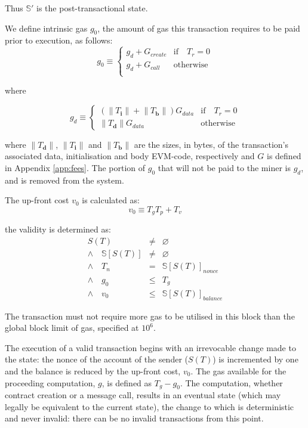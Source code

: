 \documentclass[9pt,oneside]{amsart}
\begin{document}
\begin{multicols}{2}
Thus $\mathbb{S}'$ is the post-transactional state.

We define intrinsic gas $g_0$, the amount of gas this transaction requires to be paid prior to execution, as follows:
\begin{equation}
g_0 \equiv \begin{cases}
g_d + G_{create} & \text{if} \quad T_r = 0 \\
g_d + G_{call} & \text{otherwise} \\
\end{cases}
\end{equation}

where

\begin{equation}
g_d \equiv \begin{cases} (\lVert T_\mathbf{i}\rVert + \lVert T_\mathbf{b}\rVert) G_{data} & \text{if} \quad T_r = 0 \\
 \lVert T_\mathbf{d}\rVert G_{data} & \text{otherwise}
 \end{cases}
\end{equation}

where $\lVert T_\mathbf{d}\rVert$, $\lVert T_\mathbf{i}\rVert$ and $\lVert T_\mathbf{b}\rVert$ are the sizes, in bytes, of the transaction's associated data, initialisation and body EVM-code, respectively and $G$ is defined in Appendix \ref{app:fees}. The portion of $g_0$ that will not be paid to the miner is $g_d$, and is removed from the system.


The up-front cost $v_0$ is calculated as:
\begin{equation}
v_0 \equiv T_g T_p + T_v
\end{equation}

the validity is determined as:
\begin{eqnarray}
S(T) & \neq & \varnothing \\ \wedge \quad \mathbb{S}[S(T)] & \neq & \varnothing \\ \wedge \quad T_n & = & \mathbb{S}[S(T)]_{nonce} \\ \wedge \quad g_0 & \leq & T_g \\ \wedge \quad v_0 & \leq & \mathbb{S}[S(T)]_{balance}
\end{eqnarray}

The transaction must not require more gas to be utilised in this block than the global block limit of gas, specified at $10^6$.

The execution of a valid transaction begins with an irrevocable change made to the state: the nonce of the account of the sender ($S(T)$) is incremented by one and the balance is reduced by the up-front cost, $v_0$. The gas available for the proceeding computation, $g$, is defined as $T_g - g_0$. The computation, whether contract creation or a message call, results in an eventual state (which may legally be equivalent to the current state), the change to which is deterministic and never invalid: there can be no invalid transactions from this point.


\end{multicols}
\end{document}

